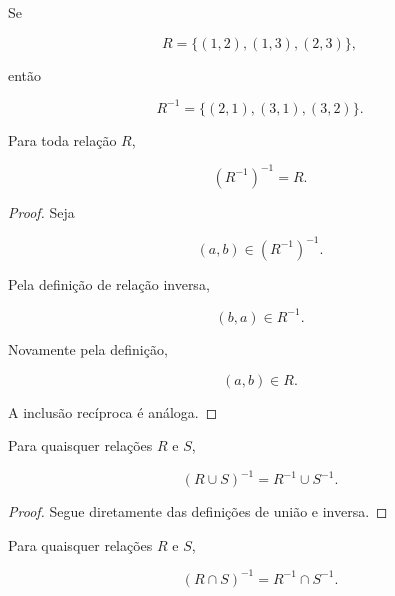 \documentclass[../../main]{subfiles}
\begin{document}
\begin{ex}

	Se

	\[
		R
		=
		\{
		(1,2),
		(1,3),
		(2,3)
		\},
	\]

	então

	\[
		R^{-1}
		=
		\{
		(2,1),
		(3,1),
		(3,2)
		\}.
	\]

\end{ex}

\begin{prop}
	\label{prop:matematica:relacoes:operacoes:dupla-inversa}

	Para toda relação \(R\),

	\[
		(R^{-1})^{-1}
		=
		R.
	\]

\end{prop}

\begin{proof}

	Seja

	\[
		(a,b)\in (R^{-1})^{-1}.
	\]

	Pela definição de relação inversa,

	\[
		(b,a)\in R^{-1}.
	\]

	Novamente pela definição,

	\[
		(a,b)\in R.
	\]

	A inclusão recíproca é análoga.

\end{proof}

\begin{prop}
	\label{prop:matematica:relacoes:operacoes:inversa-uniao}

	Para quaisquer relações \(R\) e \(S\),

	\[
		(R\cup S)^{-1}
		=
		R^{-1}\cup S^{-1}.
	\]

\end{prop}

\begin{proof}

	Segue diretamente das definições de união e inversa.

\end{proof}

\begin{prop}
	\label{prop:matematica:relacoes:operacoes:inversa-intersecao}

	Para quaisquer relações \(R\) e \(S\),

	\[
		(R\cap S)^{-1}
		=
		R^{-1}\cap S^{-1}.
	\]

\end{prop}
\end{document}
